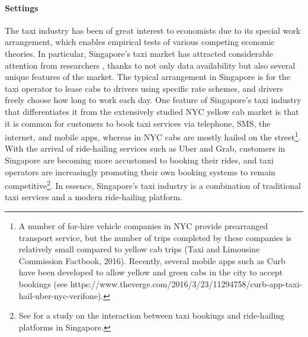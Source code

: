 \documentclass[reviewmode]{restat}
\begin{document}
\paragraph{Settings} The taxi industry has been of great interest to economists due to its special work 
arrangement, which enables empirical tests of various competing economic theories. In particular, 
Singapore's taxi market has attracted considerable attention from researchers \citep{Ho3074,chou2002testing,agarwal2015singaporean,agarwal2017anticipated,agarwal2018fickle}, 
thanks to not only data availability but also several unique features of the market. The typical 
arrangement in Singapore is for the taxi operator to lease cabs to drivers using specific rate schemes,
and drivers freely choose how long to work each day.
One feature of Singapore's taxi industry that differentiates it from the extensively studied NYC yellow 
cab market is that it is common for customers to book taxi services via telephone, SMS, the internet, 
and mobile apps, whereas in NYC cabs are mostly hailed on the street\footnote{A number of for-hire vehicle
companies in NYC provide prearranged transport service, but the number of trips completed by these companies 
is relatively small compared to yellow cab trips (Taxi and Limousine Commission Factbook, 2016). Recently,
several mobile apps such as Curb have been developed to allow yellow and green cabs in the city to accept
bookings (see https://www.theverge.com/2016/3/23/11294758/curb-app-taxi-hail-uber-nyc-verifone).}. 
With the arrival of ride-hailing services such as Uber and Grab, customers in Singapore are becoming more
accustomed to booking their rides, and taxi operators are increasingly promoting their own booking systems
to remain competitive\footnote{See \citet{agarwal2018fickle} for a study on the interaction between taxi 
bookings and ride-hailing platforms in Singapore.}. In essence, Singapore's taxi industry is a combination 
of traditional taxi services and a modern ride-hailing platform.

\end{document}
